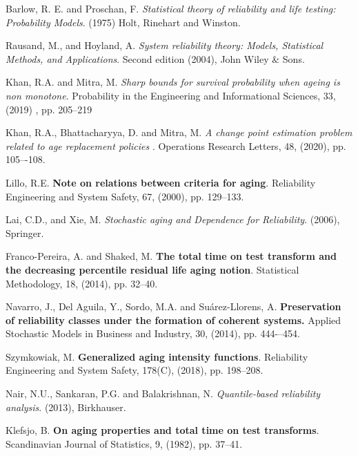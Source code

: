 \documentclass[preprint,12pt]{elsarticle}
\begin{document}
\begin{thebibliography}{}


 Barlow, R. E. and Proschan, F. \textit{Statistical theory of reliability and life testing: Probability Models}. (1975) Holt, Rinehart and Winston.

 Rausand, M., and Hoyland, A. \textit{System reliability theory: Models, Statistical Methods, and Applications}. Second edition (2004), John Wiley $\&$ Sons. 

 Khan, R.A. and Mitra, M. \textit{Sharp bounds for survival probability when ageing is non monotone}. Probability in the Engineering and Informational Sciences, 33, (2019) , pp. 205--219

 Khan, R.A., Bhattacharyya, D. and Mitra, M. \textit{A change point estimation problem related to age replacement policies
}. Operations Research Letters, 48, (2020), pp. 105–-108.


 Lillo, R.E. {\bf Note on relations between criteria for aging}. Reliability Engineering and System Safety, 67, (2000), pp. 129--133.

 Lai, C.D., and Xie, M. {\it Stochastic aging and Dependence for Reliability}. (2006), Springer.


%

 Franco-Pereira, A. and Shaked, M. \textbf{The total time on test transform and the decreasing percentile residual life aging notion}. Statistical Methodology, 18, (2014), pp. 32--40.

 Navarro, J., Del Aguila, Y., Sordo, M.A. and Su\'arez-Llorens, A. {\bf Preservation of reliability classes under the formation of coherent systems.} Applied Stochastic Models in Business and Industry, 30, (2014), pp. 444-–454.


 Szymkowiak, M.  {\bf Generalized aging intensity functions}. Reliability Engineering and System Safety, 178(C), (2018), pp. 198--208.



 Nair, N.U., Sankaran, P.G. and Balakrishnan, N. {\it Quantile-based reliability analysis}. (2013), Birkhauser.


 Klefsjo, B. \textbf{On aging properties and total time on test transforms}. Scandinavian Journal of Statistics, 9, (1982), pp. 37--41.


\end{thebibliography}
\end{document}
